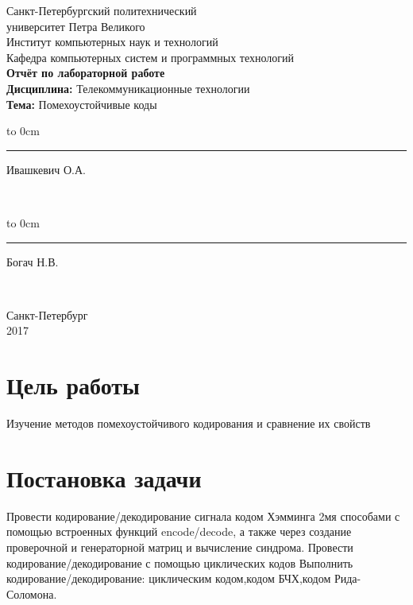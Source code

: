 \documentclass[10pt,a4paper,oneside]{article}
\begin{document}
 
\begin{titlepage}
		\newpage
		\begin{center} %
			Санкт-Петербургский политехнический\\ 
			университет Петра Великого\\
			Институт компьютерных наук и технологий\\
			Кафедра компьютерных систем и программных технологий\\
			\vspace{7cm}
			\textbf {Отчёт по лабораторной работе}\\
			\textbf {Дисциплина:} Телекоммуникационные технологии\\
			\textbf{Тема:} Помехоустойчивые коды
		\end{center} %
		\vspace{8cm} %
		
		\vfill
		
		\hfill\parbox{9 cm}{\hspace*{3cm}\hbox to 0cm{\raisebox{-1em}{\small(подпись)}}\hspace*{-0.8cm}\rule{3cm}{0.8pt} Ивашкевич О.А.}\\[0.6cm]
		
		 \hfill\parbox{9 cm}{\hspace*{3cm}\hbox to 0cm{\raisebox{-1em}{\small(подпись)}}\hspace*{-0.8cm}\rule{3cm}{0.8pt} Богач Н.В. }\\[0.6cm]
		
		
		
		
		\vspace{\fill}
		\begin{center}
			Санкт-Петербург \\ 2017
		\end{center}
	\end{titlepage}
\newpage
\newpage

\section{Цель работы}
Изучение методов помехоустойчивого кодирования и сравнение их свойств
\section{Постановка задачи}
Провести кодирование/декодирование сигнала кодом Хэмминга 2мя способами с помощью встроенных функций encode/decode, а также через создание проверочной и генераторной матриц и вычисление синдрома. Провести кодирование/декодирование с помощью циклических кодов
Выполнить кодирование/декодирование:	циклическим кодом,кодом БЧХ,кодом Рида-Соломона.
\end{document}
